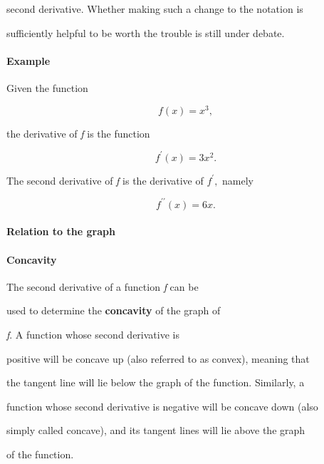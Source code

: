 second derivative. Whether making such a change to the notation is

sufficiently helpful to be worth the trouble is still under debate.



\paragraph{Example}



Given the function



$$f(x) = x^3,$$



the derivative of \textit{f} is the function



$$f^{\prime}(x) = 3x^2.$$



The second derivative of \textit{f} is the derivative of $f^{\prime},$ namely



$$f^{\prime\prime}(x) = 6x.$$



\paragraph{Relation to the graph}



\paragraph{Concavity}



The second derivative of a function \textit{f} can be

used to determine the \textbf{concavity} of the graph of

\textit{f}. A function whose second derivative is

positive will be concave up (also referred to as convex), meaning that

the tangent line will lie below the graph of the function. Similarly, a

function whose second derivative is negative will be concave down (also

simply called concave), and its tangent lines will lie above the graph

of the function.



